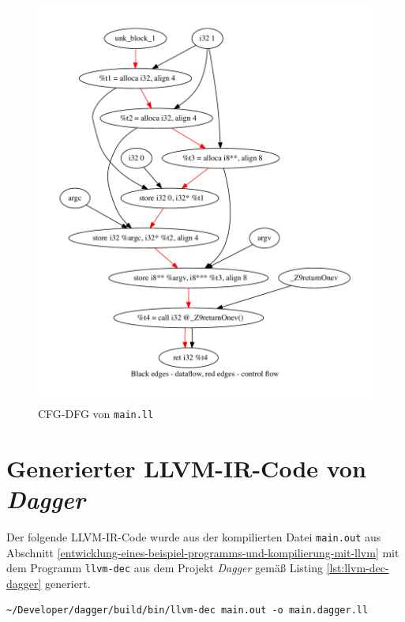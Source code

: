 \begin{figure}[H]
\centering
\includegraphics{../Resources/Bilder/cfg_dfg.pdf}
\caption{\gls{CFG-DFG} von \texttt{main.ll}}
\label{fig:main-cfg-dfg}
\end{figure}

\newpage

\section{Generierter LLVM-IR-Code von \textit{Dagger}}
Der folgende \gls{LLVM}-\gls{IR}-Code wurde aus der kompilierten Datei \texttt{main.out} aus Abschnitt \ref{entwicklung-eines-beispiel-programms-und-kompilierung-mit-llvm} mit dem Programm \texttt{llvm-dec} aus dem Projekt \textit{Dagger} gemäß Listing \ref{lst:llvm-dec-dagger} generiert.

\begin{code}
\begin{verbatim}
~/Developer/dagger/build/bin/llvm-dec main.out -o main.dagger.ll
\end{verbatim}
\caption{Befehl zur Dekompilierung mit \textit{Dagger}}
\label{lst:llvm-dec-dagger}
\end{code}

